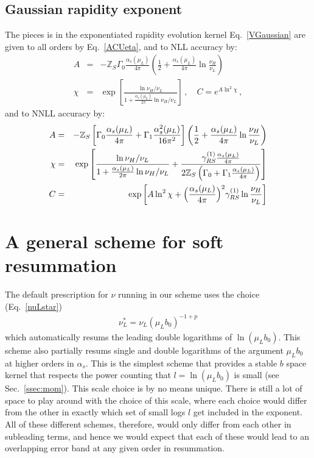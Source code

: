 \documentclass[a4,letterpaper,11pt]{article}
\newcommand{\nn}{\nonumber}
\newcommand{\bea}{\begin{eqnarray}}
\newcommand{\eea}{\end{eqnarray}}
\newcommand{\as}{\alpha_s}
\newcommand{\zed}{\mathbb{Z}}
\newcommand{\eq}[1]{Eq.~\eqref{#1}}
\newcommand{\ssec}[1]{Sec.~\ref{ssec:#1}}
\begin{document}
\subsection{Gaussian rapidity exponent}
\label{app:Gaussian}

The pieces is in the exponentiated rapidity evolution kernel \eq{VGaussian} are given to all orders by \eq{ACUeta}, and to NLL accuracy by:
\bea \label{ACUetaNLL}
A&=&-\zed_S \Gamma_0 \frac{\as(\mu_L)}{4\pi} \left(\frac12+\frac{\as(\mu_L)}{4\pi}\ln \frac{\nu_H}{\nu_L} \right) \\
\chi &=& \exp\left[ \frac{ \ln\nu_H/\nu_L }{1+\frac{\as(\mu_L)}{2\pi}\ln \nu_H/\nu_L }\right] \,,\quad C= e^{A \ln^2\chi} \,, \nn
\eea
and to NNLL accuracy by:
\bea \label{ACUetaNNLL}
A&=&-\zed_S\left[ \Gamma_0 \frac{\as(\mu_L)}{4\pi} +\Gamma_1 \frac{\as^2(\mu_L)}{16\pi^2}\right]
\left(\frac12+\frac{\as(\mu_L)}{4\pi}\ln \frac{\nu_H}{\nu_L} \right) \\
\chi &=& \exp\left[ 
\frac{ \ln\nu_H/\nu_L }{1+\frac{\as(\mu_L)}{2\pi}\ln \nu_H/\nu_L }
+\frac{\gamma_{RS}^{(1)}\frac{\as(\mu_L)}{4\pi} }{2\zed_S\left( \Gamma_0 +\Gamma_1  \frac{\as(\mu_L)}{4\pi}\right)}
\right] \nn \\
C&=& \exp\left[ A \ln^2\chi + \Bigl(\frac{\as(\mu_L)}{4\pi}\Bigr)^2  \gamma_{RS}^{(1)}\ln\frac{\nu_H}{\nu_L} \right]\nn
\eea


\section{A general scheme for soft resummation}
\label{app:Cparameter}

The default prescription for $\nu$ running in our scheme uses the choice (\eq{nuLstar})
\bea
\nu_L^*= \nu_L(\mu_L b_0)^{-1+p} 
\eea
which automatically resums the leading double logarithms of $\ln(\mu_L b_0)$. This scheme also partially resums single and double logarithms of the argument $\mu_Lb_0$ at higher orders in $\alpha_s$. This is the simplest scheme that provides a stable $b$ space kernel that respects the power counting that $l =\ln(\mu_L b_0)$ is small (see \ssec{mom}). This scale choice is by no means unique. There is still a lot of space to play around with the choice of this scale, where each choice would differ from the other in exactly which set of small logs $l$ get included in the exponent.  All of these different schemes, therefore, would only differ from each other in subleading terms, and hence we would expect that each of these would lead to an overlapping error band at any given order in resummation.
\end{document}
